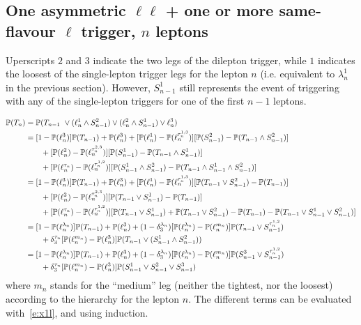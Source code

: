 \documentclass{article}
\newcommand{\pro}{\ensuremath{\mathbb{P}}}
\begin{document}
\subsection{One asymmetric $\ell\ell$ + one or more same-flavour $\ell$ trigger, $n$ leptons}

Uperscripts $2$ and $3$ indicate the two legs of the dilepton trigger, while $1$ indicates the loosest of the single-lepton trigger legs 
for the lepton $n$ (i.e. equivalent to $\lambda_n^1$ in the previous section). However, $S_{n-1}^1$ still represents the event of triggering with any of the single-lepton triggers for one of the first $n-1$ leptons. 
 
\begin{align}
\pro(T_n) &= \pro(T_{n-1} \
\vee (\ell_n^{1} \wedge S_{n-1}^{2}) \vee (\ell_n^{2} \wedge S_{n-1}^{1}) \vee \ell_n^3) \notag\\
%
&=[1-\pro(\ell_n^3)]\pro(T_{n-1}) + \pro(\ell_n^3)
+ [\pro(\ell_n^{1}) - \pro(\ell_n^{\tau_n^{1,3}})][\pro(S_{n-1}^{2}) - \pro(T_{n-1}\wedge S_{n-1}^2) ]\notag\\
&\qquad + [\pro(\ell_n^{2}) - \pro(\ell_n^{\tau_n^{2,3}})][\pro(S_{n-1}^{1})-\pro(T_{n-1}\wedge S_{n-1}^1)]\notag\\
&\qquad +  [\pro(\ell_n^{\tau_{n}}) - \pro(\ell_n^{\tau_{n}^{1,2}}) ]
[\pro(S_{n-1}^{1}\wedge S_{n-1}^{2}) - \pro(T_{n-1}\wedge S_{n-1}^{1}\wedge S_{n-1}^{2})]\notag\\
%
&=[1-\pro(\ell_n^3)]\pro(T_{n-1}) + \pro(\ell_n^3)
 + [\pro(\ell_n^{1}) - \pro(\ell_n^{\tau_n^{1,3}})][\pro(T_{n-1}\vee  S_{n-1}^2) - \pro(T_{n-1})]\notag\\
&\qquad + [\pro(\ell_n^{2}) - \pro(\ell_n^{\tau_n^{2,3}})][\pro(T_{n-1}\vee  S_{n-1}^1) - \pro(T_{n-1})]\notag\\
&\qquad +  [\pro(\ell_n^{\tau_{n}}) - \pro(\ell_n^{\tau_{n}^{1,2}}) ]
[\pro(T_{n-1} \vee S_{n-1}^{1})+\pro(T_{n-1}\vee S_{n-1}^{2}) 
- \pro(T_{n-1})-\pro(T_{n-1} \vee S_{n-1}^{1} \vee S_{n-1}^{2})]\notag\\
%
&= [1-\pro(\ell_n^{\lambda_n})]\pro(T_{n-1}) + \pro(\ell_n^3)
+ (1-\delta_3^{\lambda_n})[\pro(\ell_n^{\lambda_n}) - \pro(\ell_n^{m_n})]\pro(T_{n-1}\vee  S_{n-1}^{\tau_n^{1,2}})\notag\\
&\qquad +  \delta_3^{\tau_n}[\pro(\ell_n^{m_n}) - \pro(\ell_n^3) ]
\pro(T_{n-1} \vee (S_{n-1}^{1}\wedge S_{n-1}^{2}))\notag\\
%
&= [1-\pro(\ell_n^{\lambda_n})]\pro(T_{n-1}) + \pro(\ell_n^3)
+ (1-\delta_3^{\lambda_n})[\pro(\ell_n^{\lambda_n}) -\pro(\ell_n^{m_n})]\pro(S_{n-1}^3\vee  S_{n-1}^{\tau^{1,2}_n})\notag\\
&\qquad + \delta_3^{\tau_n} [\pro(\ell_n^{m_n}) - \pro(\ell_n^3) ]
\pro(S_{n-1}^1 \vee S_{n-1}^{2}\vee S_{n-1}^{3})
\label{e:2aO1}
\end{align}
where $m_n$ stands for the ``medium'' leg (neither the tightest, nor the loosest) according to the hierarchy for the lepton $n$. 
The different terms can be evaluated with~\ref{e:x1l}, and using induction. 
\end{document}
